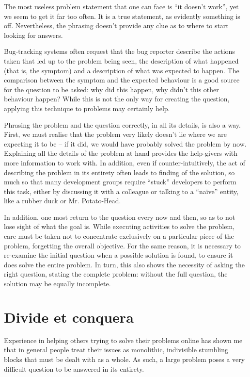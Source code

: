 The most useless problem statement that one can face is “it doesn’t work”, yet we seem to get it far too often. It is a true statement, as evidently something is off. Nevertheless, the phrasing doesn’t provide any clue as to where to start looking for answers.

Bug-tracking systems often request that the bug reporter describe the actions taken that led up to the problem being seen, the description of what happened (that is, the symptom) and a description of what was expected to happen. The comparison between the symptom and the expected behaviour is a good source for the question to be asked: why did this happen, why didn’t this other behaviour happen? While this is not the only way for creating the question, applying this technique to problems may certainly help.

Phrasing the problem and the question correctly, in all its details, is also a way. First, we must realise that the problem very likely doesn’t lie where we are expecting it to be – if it did, we would have probably solved the problem by now. Explaining all the details of the problem at hand provides the help-givers with more information to work with. In addition, even if counter-intuitively, the act of describing the problem in its entirety often leads to finding of the solution, so much so that many development groups require “stuck” developers to perform this task, either by discussing it with a colleague or talking to a “naïve” entity, like a rubber duck or Mr. Potato-Head.

In addition, one most return to the question every now and then, so as to not lose sight of what the goal is. While executing activities to solve the problem, care must be taken not to concentrate exclusively on a particular piece of the problem, forgetting the overall objective. For the same reason, it is necessary to re-examine the initial question when a possible solution is found, to ensure it does solve the entire problem. In turn, this also shows the necessity of asking the right question, stating the complete problem: without the full question, the solution may be equally incomplete.

\section*{Divide et conquera}

Experience in helping others trying to solve their problems online has shown me that in general people treat their issues as monolithic, indivisible stumbling blocks that must be dealt with as a whole. As such, a large problem poses a very difficult question to be answered in its entirety.

